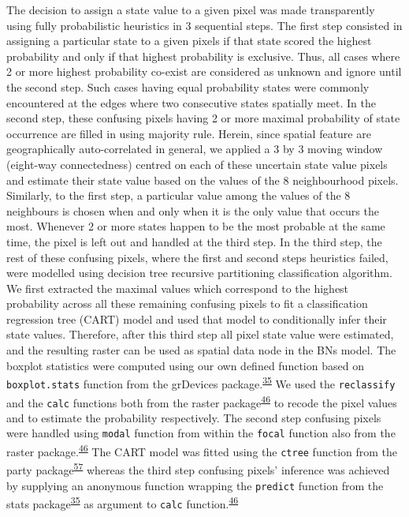 \documentclass[12pt,oneside]{article}
\begin{document}
The decision to assign a state value to a given pixel was made transparently using fully probabilistic heuristics in 3 sequential steps. The first step consisted in assigning a particular state to a given pixels if that state scored the highest probability and only if that highest probability is exclusive. Thus, all cases where 2 or more highest probability co-exist are considered as unknown and ignore until the second step. Such cases having equal probability states were commonly encountered at the edges where two consecutive states spatially meet. In the second step, these confusing pixels having 2 or more maximal probability of state occurrence are filled in using majority rule. Herein, since spatial feature are geographically auto-correlated in general, we applied a 3 by 3 moving window (eight-way connectedness) centred on each of these uncertain state value pixels and estimate their state value based on the values of the 8 neighbourhood pixels. Similarly, to the first step, a particular value among the values of the 8 neighbours is chosen when and only when it is the only value that occurs the most. Whenever 2 or more states happen to be the most probable at the same time, the pixel is left out and handled at the third step. In the third step, the rest of these confusing pixels, where the first and second steps heuristics failed, were modelled using decision tree recursive partitioning classification algorithm. We first extracted the maximal values which correspond to the highest probability across all these remaining confusing pixels to fit a classification regression tree (CART) model and used that model to conditionally infer their state values. Therefore, after this third step all pixel state value were estimated, and the resulting raster can be used as spatial data node in the BNs model. The boxplot statistics were computed using our own defined function based on \texttt{boxplot.stats} function from the grDevices package.\textsuperscript{\protect\hyperlink{ref-RCoreTeam_2018}{35}} We used the \texttt{reclassify} and the \texttt{calc} functions both from the raster package\textsuperscript{\protect\hyperlink{ref-Hijmans_2019}{46}} to recode the pixel values and to estimate the probability respectively. The second step confusing pixels were handled using \texttt{modal} function from within the \texttt{focal} function also from the raster package.\textsuperscript{\protect\hyperlink{ref-Hijmans_2019}{46}} The CART model was fitted using the \texttt{ctree} function from the party package\textsuperscript{\protect\hyperlink{ref-Hothorn_et_al_2006}{57}} whereas the third step confusing pixels' inference was achieved by supplying an anonymous function wrapping the \texttt{predict} function from the stats package\textsuperscript{\protect\hyperlink{ref-RCoreTeam_2018}{35}} as argument to \texttt{calc} function.\textsuperscript{\protect\hyperlink{ref-Hijmans_2019}{46}}
\end{document}
